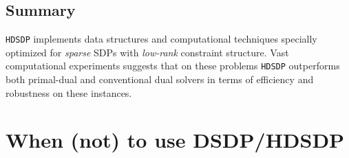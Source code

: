 
\subsection{Summary}
{{\texttt{HDSDP}}} implements data structures and computational techniques specially optimized for \textit{sparse} SDPs with \textit{low-rank} constraint structure. Vast computational experiments suggests that on these problems {{\texttt{HDSDP}}} outperforms both primal-dual and conventional dual solvers in terms of efficiency and robustness on these instances. 


\section{When (not) to use DSDP/HDSDP}

